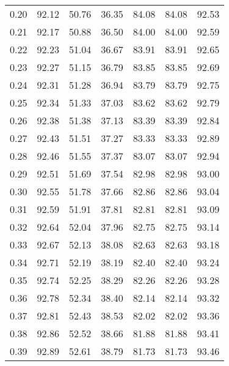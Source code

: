 \begin{tabular}{|c|c|c|c|c|c|c|}
      0.20 &     92.12 &     50.76 &      36.35 &   84.08 &      84.08 &         92.53 \\
      0.21 &     92.17 &     50.88 &      36.50 &   84.00 &      84.00 &         92.59 \\
      0.22 &     92.23 &     51.04 &      36.67 &   83.91 &      83.91 &         92.65 \\
      0.23 &     92.27 &     51.15 &      36.79 &   83.85 &      83.85 &         92.69 \\
      0.24 &     92.31 &     51.28 &      36.94 &   83.79 &      83.79 &         92.75 \\
      0.25 &     92.34 &     51.33 &      37.03 &   83.62 &      83.62 &         92.79 \\
      0.26 &     92.38 &     51.38 &      37.13 &   83.39 &      83.39 &         92.84 \\
      0.27 &     92.43 &     51.51 &      37.27 &   83.33 &      83.33 &         92.89 \\
      0.28 &     92.46 &     51.55 &      37.37 &   83.07 &      83.07 &         92.94 \\
      0.29 &     92.51 &     51.69 &      37.54 &   82.98 &      82.98 &         93.00 \\
      0.30 &     92.55 &     51.78 &      37.66 &   82.86 &      82.86 &         93.04 \\
      0.31 &     92.59 &     51.91 &      37.81 &   82.81 &      82.81 &         93.09 \\
      0.32 &     92.64 &     52.04 &      37.96 &   82.75 &      82.75 &         93.14 \\
      0.33 &     92.67 &     52.13 &      38.08 &   82.63 &      82.63 &         93.18 \\
      0.34 &     92.71 &     52.19 &      38.19 &   82.40 &      82.40 &         93.24 \\
      0.35 &     92.74 &     52.25 &      38.29 &   82.26 &      82.26 &         93.28 \\
      0.36 &     92.78 &     52.34 &      38.40 &   82.14 &      82.14 &         93.32 \\
      0.37 &     92.81 &     52.43 &      38.53 &   82.02 &      82.02 &         93.36 \\
      0.38 &     92.86 &     52.52 &      38.66 &   81.88 &      81.88 &         93.41 \\
      0.39 &     92.89 &     52.61 &      38.79 &   81.73 &      81.73 &         93.46 \\

\end{tabular}
